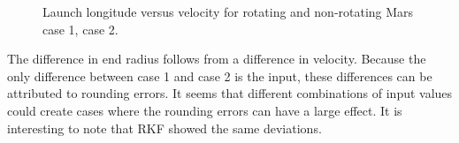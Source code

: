 \begin{figure}[H]
\centering
{} 
\caption{Launch longitude versus velocity for rotating and non-rotating Mars \protect{} case 1,  \protect{} case 2. } 
\label{fig:launchLongitudeVsVelocityCase1combined} 
\end{figure}

\noindent
The difference in end radius follows from a difference in velocity. Because the only difference between case 1 and case 2 is the input, these differences can be attributed to rounding errors.  It seems that different combinations of input values could create cases where the rounding errors can have a large effect. It is interesting to note that \ac{RKF} showed the same deviations.


